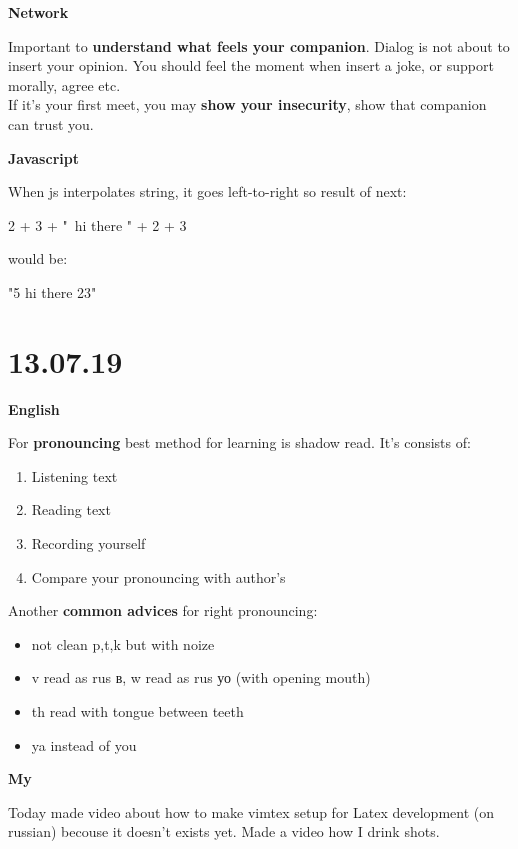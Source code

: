 \documentclass[12pt,a4paper,titlepage]{article}
\begin{document}
\begin{center}
    \large \textbf{Network}
\end{center}
Important to \textbf{understand what feels your companion}. Dialog is not about to insert your opinion.
You should feel the moment when insert a joke, or support morally, agree etc.\\
If it's your first meet, you may \textbf{show your insecurity}, show that companion can trust you.

\begin{center}
    \large \textbf{Javascript}
\end{center}
When js interpolates string, it goes left-to-right so result of next:
\begin{center}
    2 + 3 + "\ hi there " + 2 + 3
\end{center}
would be:
\begin{center}
    "5 hi there 23"
\end{center}

\newpage
\section{13.07.19}

\begin{center}
    \large \textbf{English}
\end{center}
For \textbf{pronouncing} best method for learning is shadow read. It's consists of:
\begin{enumerate}
    \item{Listening text}
    \item{Reading text}
    \item{Recording yourself}
    \item{Compare your pronouncing with author's}
\end{enumerate}
Another \textbf{common advices} for right pronouncing:
\begin{itemize}
    \item{not clean p,t,k but with noize}
    \item{v read as rus в, w read as rus уо (with opening mouth)}
    \item{th read with tongue between teeth}
    \item{ya instead of you}
\end{itemize}

\begin{center}
    \large \textbf{My}
\end{center}
Today made video about how to make vimtex setup for Latex development (on russian) becouse it doesn't exists yet.
Made a video how I drink shots.
\end{document}
